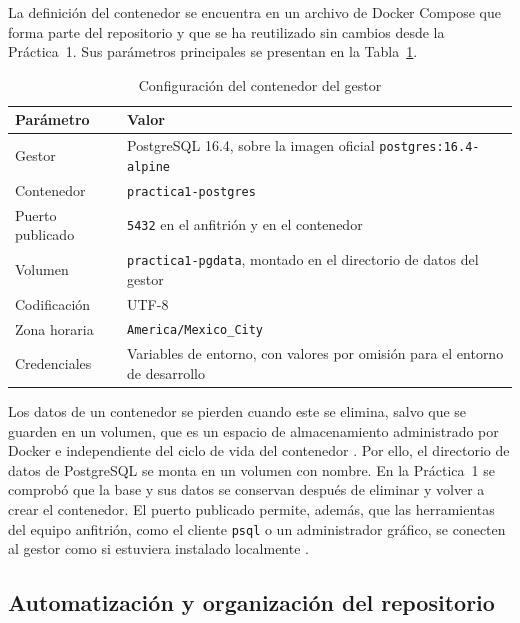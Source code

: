 La definición del contenedor se encuentra en un archivo de Docker Compose que forma parte del repositorio y que se ha reutilizado sin cambios desde la Práctica~1. Sus parámetros principales se presentan en la Tabla~\ref{tab:entorno}.

\begin{table}[H]
    \centering
    \small
    \begin{tabularx}{\textwidth}
        {
            >{\RaggedRight\arraybackslash}p{4cm}
            >{\RaggedRight\arraybackslash}X
        }
        \toprule
        \textbf{Parámetro} & \textbf{Valor} \\
        \midrule
        Gestor & PostgreSQL 16.4, sobre la imagen oficial \texttt{postgres:16.4-alpine} \\
        Contenedor & \texttt{practica1-postgres} \\
        Puerto publicado & \texttt{5432} en el anfitrión y en el contenedor \\
        Volumen & \texttt{practica1-pgdata}, montado en el directorio de datos del gestor \\
        Codificación & UTF-8 \\
        Zona horaria & \texttt{America/Mexico\_City} \\
        Credenciales & Variables de entorno, con valores por omisión para el entorno de desarrollo \\
        \bottomrule
    \end{tabularx}
    \captionsetup{labelfont=bf, textfont=it, labelsep=newline, justification=raggedright, singlelinecheck=false}
    \caption{Configuración del contenedor del gestor}
    \label{tab:entorno}
\end{table}

Los datos de un contenedor se pierden cuando este se elimina, salvo que se guarden en un volumen, que es un espacio de almacenamiento administrado por Docker e independiente del ciclo de vida del contenedor \parencite{docker_volumes}. Por ello, el directorio de datos de PostgreSQL se monta en un volumen con nombre. En la Práctica~1 se comprobó que la base y sus datos se conservan después de eliminar y volver a crear el contenedor. El puerto publicado permite, además, que las herramientas del equipo anfitrión, como el cliente \texttt{psql} o un administrador gráfico, se conecten al gestor como si estuviera instalado localmente \parencite{docker_publishing_ports}.

\subsection{Automatización y organización del repositorio}

